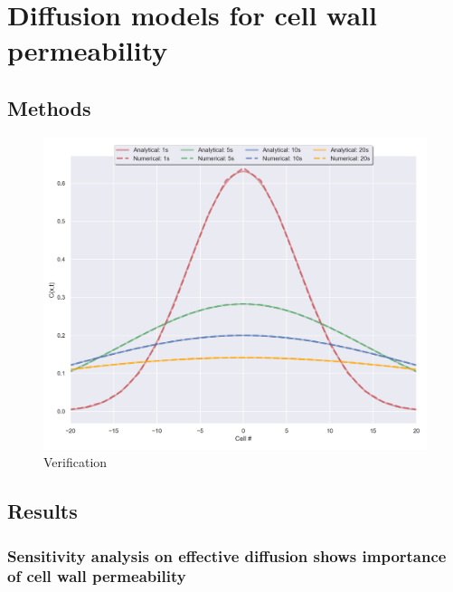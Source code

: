 \documentclass[../main.tex]{subfiles}
\begin{document}
\chapter{Diffusion models for cell wall permeability}
\label{cha:diffusion}

\section{Methods}
\label{sec:diffmodelling}

\begin{figure}[ht]
  \centering
  \includegraphics[width=0.5\columnwidth]{figures/compare_equations.png}
  \caption{\label{fig:analyticalsolutions} Verification}
\end{figure}


\section{Results}


\subsection{Sensitivity analysis on effective diffusion shows importance of cell
  wall permeability}
\end{document}
